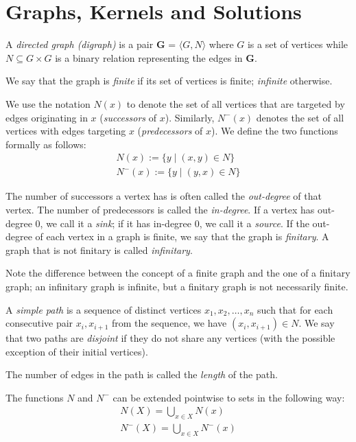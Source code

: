 \section{Graphs, Kernels and Solutions}
\label{sec:Graphs, Kernels and Solutions}
\begin{definition}
  A \textit{directed graph (digraph)} is a pair \textbf{G} = $\langle G,N \rangle$ where $G$ is a set of vertices while $N \subseteq G \times G$ is a binary relation representing the edges in \textbf{G}.
\end{definition}
We say that the graph is \textit{finite} if its set of vertices is finite; \textit{infinite} otherwise.

We use the notation $N(x)$ to denote the set of all vertices that are targeted by edges originating in $x$ (\textit{successors} of $x$).
Similarly, $N^-(x)$ denotes the set of all vertices with edges targeting $x$ (\textit{predecessors} of $x$).
We define the two functions formally as follows:
\begin{align}
  N(x) := \{y \;|\; (x,y) \in N\}\\
  N^-(x) := \{ y \;|\; (y,x) \in N \}
\end{align}
\begin{definition}
  The number of successors a vertex has is often called the \textit{out-degree} of that vertex.
  The number of predecessors is called the \textit{in-degree}.
  If a vertex has out-degree 0, we call it a \textit{sink}; if it has in-degree 0, we call it a \textit{source}.
  If the out-degree of each vertex in a graph is finite, we say that the graph is \textit{finitary}.
  A graph that is not finitary is called \textit{infinitary}.
\end{definition}
Note the difference between the concept of a finite graph and the one of a finitary graph;
an infinitary graph is infinite, but a finitary graph is not necessarily finite.
\begin{definition}
  A \textit{simple path} is a sequence of distinct vertices $x_1,x_2,\dots,x_n$ such that for each consecutive pair $x_i,x_{i+1}$ from the sequence, we have $(x_i, x_{i+1}) \in N$.
  We say that two paths are \textit{disjoint} if they do not share any vertices (with the possible exception of their initial vertices).
\end{definition}
The number of edges in the path is called the \textit{length} of the path.

The functions $N$ and $N^-$ can be extended pointwise to sets in the following way:
\begin{align}
  N(X) = \bigcup_{x \in X} N(x)\\
  N^-(X) = \bigcup_{x \in X} N^-(x)
\end{align}

